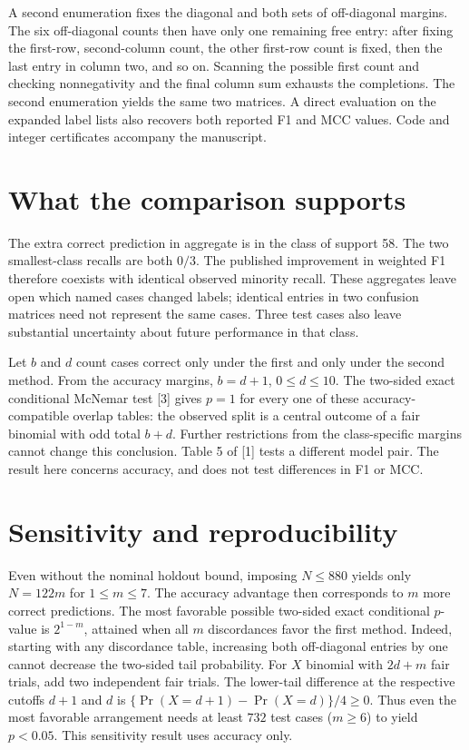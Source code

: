 \documentclass[11pt]{article}
\begin{document}
A second enumeration fixes the diagonal and both sets of off-diagonal margins. The six off-diagonal counts then have only one remaining free entry: after fixing the first-row, second-column count, the other first-row count is fixed, then the last entry in column two, and so on. Scanning the possible first count and checking nonnegativity and the final column sum exhausts the completions. The second enumeration yields the same two matrices. A direct evaluation on the expanded label lists also recovers both reported F1 and MCC values. Code and integer certificates accompany the manuscript.

\section*{What the comparison supports}
The extra correct prediction in aggregate is in the class of support 58. The two smallest-class recalls are both $0/3$. The published improvement in weighted F1 therefore coexists with identical observed minority recall. These aggregates leave open which named cases changed labels; identical entries in two confusion matrices need not represent the same cases. Three test cases also leave substantial uncertainty about future performance in that class.

Let $b$ and $d$ count cases correct only under the first and only under the second method. From the accuracy margins, $b=d+1$, $0\le d\le10$. The two-sided exact conditional McNemar test [3] gives $p=1$ for every one of these accuracy-compatible overlap tables: the observed split is a central outcome of a fair binomial with odd total $b+d$. Further restrictions from the class-specific margins cannot change this conclusion. Table 5 of [1] tests a different model pair. The result here concerns accuracy, and does not test differences in F1 or MCC.

\newpage
\section*{Sensitivity and reproducibility}
Even without the nominal holdout bound, imposing $N\le880$ yields only $N=122m$ for $1\le m\le7$. The accuracy advantage then corresponds to $m$ more correct predictions. The most favorable possible two-sided exact conditional $p$-value is $2^{1-m}$, attained when all $m$ discordances favor the first method. Indeed, starting with any discordance table, increasing both off-diagonal entries by one cannot decrease the two-sided tail probability. For $X$ binomial with $2d+m$ fair trials, add two independent fair trials. The lower-tail difference at the respective cutoffs $d+1$ and $d$ is $\{\Pr(X=d+1)-\Pr(X=d)\}/4\ge0$. Thus even the most favorable arrangement needs at least $732$ test cases ($m\ge6$) to yield $p<0.05$. This sensitivity result uses accuracy only.
\end{document}
